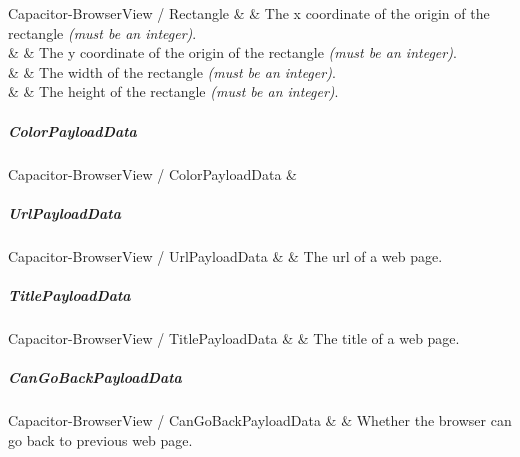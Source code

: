 \begin{interfacedesc}{Capacitor-BrowserView / Rectangle}
        &  & The x coordinate of the origin of the rectangle \textit{(must be an integer)}. \\ \hline
        &  & The y coordinate of the origin of the rectangle \textit{(must be an integer)}. \\ \hline
    &  & The width of the rectangle \textit{(must be an integer)}. \\ \hline
   &  & The height of the rectangle \textit{(must be an integer)}. \\ \hline
\end{interfacedesc}


\subparagraph{ColorPayloadData}

\begin{interface}{Capacitor-BrowserView / ColorPayloadData}
   &  \\ \hline
\end{interface}


\subparagraph{UrlPayloadData}

\begin{interfacedesc}{Capacitor-BrowserView / UrlPayloadData}
   &  & The \ac{url} of a web page. \\ \hline
\end{interfacedesc}


\subparagraph{TitlePayloadData}

\begin{interfacedesc}{Capacitor-BrowserView / TitlePayloadData}
   &  & The title of a web page. \\ \hline

\end{interfacedesc}


\subparagraph{CanGoBackPayloadData}

\begin{interfacedesc}{Capacitor-BrowserView / CanGoBackPayloadData}
   &  & Whether the browser can go back to previous web page. \\ \hline
\end{interfacedesc}


